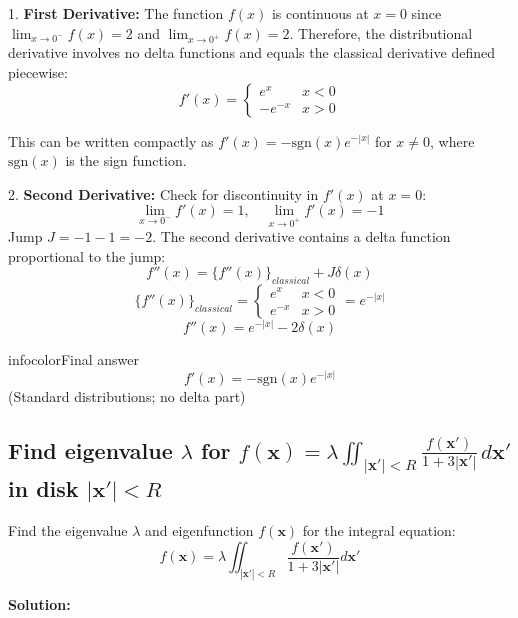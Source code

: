 \documentclass[a4paper,11pt]{article} %
\newenvironment{summarybox}[1][]{\begin{custombox}[#1]{infocolor}{Final answer}}{\end{custombox}}
\begin{document}
1. \textbf{First Derivative:}
The function $f(x)$ is continuous at $x=0$ since $\lim_{x\to 0^-} f(x) = 2$ and $\lim_{x\to 0^+} f(x) = 2$.
Therefore, the distributional derivative involves no delta functions and equals the classical derivative defined piecewise:
$$ f'(x) = \begin{cases} e^x & x < 0 \\ -e^{-x} & x > 0 \end{cases} $$

This can be written compactly as $f'(x) = -\text{sgn}(x)e^{-|x|}$ for $x \neq 0$, where $\text{sgn}(x)$ is the sign function.

2. \textbf{Second Derivative:}
Check for discontinuity in $f'(x)$ at $x=0$:
$$ \lim_{x\to 0^-} f'(x) = 1, \quad \lim_{x\to 0^+} f'(x) = -1 $$
Jump $J = -1 - 1 = -2$.
The second derivative contains a delta function proportional to the jump:
$$ f''(x) = \{f''(x)\}_{classical} + J\delta(x) $$
$$ \{f''(x)\}_{classical} = \begin{cases} e^x & x < 0 \\ e^{-x} & x > 0 \end{cases} = e^{-|x|} $$
$$ f''(x) = e^{-|x|} - 2\delta(x) $$

\begin{summarybox}[title={Part B Answer}]
$$ f'(x) = -\text{sgn}(x) e^{-|x|} $$
(Standard distributions; no delta part)
\end{summarybox}

\newpage

\subsection{\texorpdfstring{Find eigenvalue $\lambda$ for $f(\mathbf{x})=\lambda\iint_{|\mathbf{x}'|<R}\frac{f(\mathbf{x}')}{1+3|\mathbf{x}'|}\,d\mathbf{x}'$ in disk $|\mathbf{x}'|<R$}{Kernel independent of $\mathbf{x}$ implies $f=\mathrm{const}$; eigenvalue from 2D polar integral over disk}}

\begin{problembox}
Find the eigenvalue $\lambda$ and eigenfunction $f(\mathbf{x})$ for the integral equation:
$$f(\mathbf{x}) = \lambda \iint_{|\mathbf{x}'|<R} \frac{f(\mathbf{x}')}{1+3|\mathbf{x}'|} d\mathbf{x}'$$
\end{problembox}

\textbf{Solution:}
\end{document}
